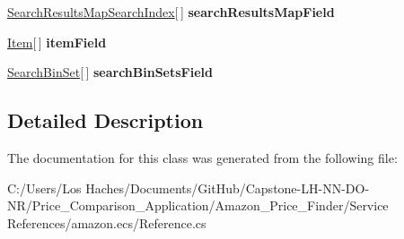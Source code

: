 \begin{DoxyCompactItemize}
\item 
\hypertarget{class_price___comparison_1_1amazon_1_1ecs_1_1_items_afc6e1ea8d313d585f155b86f1fef3a24}{\hyperlink{class_price___comparison_1_1amazon_1_1ecs_1_1_search_results_map_search_index}{Search\-Results\-Map\-Search\-Index}\mbox{[}$\,$\mbox{]} {\bfseries search\-Results\-Map\-Field}}\label{class_price___comparison_1_1amazon_1_1ecs_1_1_items_afc6e1ea8d313d585f155b86f1fef3a24}

\item 
\hypertarget{class_price___comparison_1_1amazon_1_1ecs_1_1_items_ac6448f4c9de23e4978c8624c6f7963a8}{\hyperlink{class_price___comparison_1_1amazon_1_1ecs_1_1_item}{Item}\mbox{[}$\,$\mbox{]} {\bfseries item\-Field}}\label{class_price___comparison_1_1amazon_1_1ecs_1_1_items_ac6448f4c9de23e4978c8624c6f7963a8}

\item 
\hypertarget{class_price___comparison_1_1amazon_1_1ecs_1_1_items_a76feae0a770b526807992a530b8e296d}{\hyperlink{class_price___comparison_1_1amazon_1_1ecs_1_1_search_bin_set}{Search\-Bin\-Set}\mbox{[}$\,$\mbox{]} {\bfseries search\-Bin\-Sets\-Field}}\label{class_price___comparison_1_1amazon_1_1ecs_1_1_items_a76feae0a770b526807992a530b8e296d}

\end{DoxyCompactItemize}


\subsection{Detailed Description}


The documentation for this class was generated from the following file\-:\begin{DoxyCompactItemize}
\item 
C\-:/\-Users/\-Los Haches/\-Documents/\-Git\-Hub/\-Capstone-\/\-L\-H-\/\-N\-N-\/\-D\-O-\/\-N\-R/\-Price\-\_\-\-Comparison\-\_\-\-Application/\-Amazon\-\_\-\-Price\-\_\-\-Finder/\-Service References/amazon.\-ecs/Reference.\-cs\end{DoxyCompactItemize}
